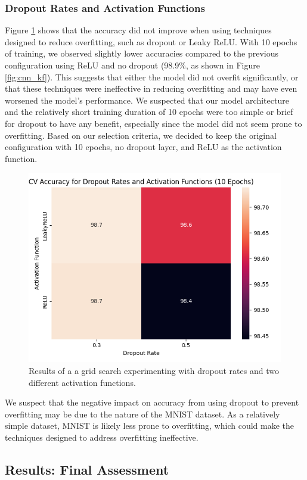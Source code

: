 \subsubsection{Dropout Rates and Activation Functions}
Figure \ref{fig:cnn_pp} shows that the accuracy did not improve when using techniques designed to reduce overfitting, such as dropout or Leaky ReLU. With 10 epochs of training, we observed slightly lower accuracies compared to the previous configuration using ReLU and no dropout (98.9\%, as shown in Figure \ref{fig:cnn_kf}). This suggests that either the model did not overfit significantly, or that these techniques were ineffective in reducing overfitting and may have even worsened the model's performance. We suspected that our model architecture and the relatively short training duration of 10 epochs were too simple or brief for dropout to have any benefit, especially since the model did not seem prone to overfitting. Based on our selection criteria, we decided to keep the original configuration with 10 epochs, no dropout layer, and ReLU as the activation function.
\begin{figure}[H]
    \centering
    \includegraphics[width=0.7\linewidth]{results/cnn_grid_search/heatmap_grid_search_da.png}
    \caption{Results of a a grid search experimenting with dropout rates and two different activation functions.}
    \label{fig:cnn_pp}
\end{figure}

We suspect that the negative impact on accuracy from using dropout to prevent overfitting may be due to the nature of the MNIST dataset. As a relatively simple dataset, MNIST is likely less prone to overfitting, which could make the techniques designed to address overfitting ineffective.

\subsection{Results: Final Assessment}

